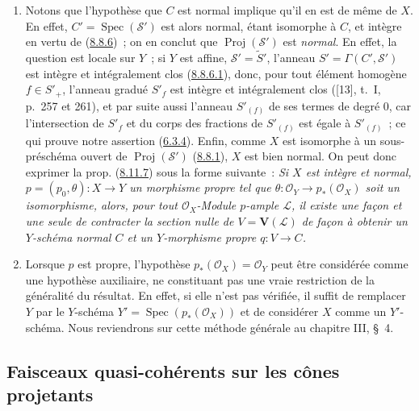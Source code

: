 \begin{remark}[8.11.8]
\label{II.8.11.8-fr}
\begin{enumerate}
  \item[\rm{(i)}] Notons que l'hypothèse que $C$ est normal implique qu'il en
  est de même de $X$. En effet, $C'=\operatorname{Spec}(\mathcal{S}')$ est
  alors normal, étant isomorphe à $C$, et intègre en vertu de
  (\hyperref[II.8.8.6-fr]{8.8.6})~; on en conclut que
  $\operatorname{Proj}(\mathcal{S}')$ est \emph{normal}. En effet, la question
  est locale sur $Y$~; si $Y$ est affine, $\mathcal{S}'=\widetilde{S}'$,
  l'anneau $S'=\Gamma(C',\mathcal{S}')$ est intègre et intégralement clos
  (\hyperref[II.8.8.6.1-fr]{8.8.6.1}), donc, pour tout élément homogène
  $f\in S'_+$, l'anneau gradué $S'_f$ est intègre et intégralement clos
  ([13], t.~I, p.~257 et 261), et par suite aussi l'anneau $S'_{(f)}$ de ses
  termes de degré 0, car l'intersection de $S'_f$ et du corps des fractions de
  $S'_{(f)}$ est égale à $S'_{(f)}$~; ce qui prouve notre assertion
  (\hyperref[II.6.3.4-fr]{6.3.4}). Enfin, comme $X$ est isomorphe à un
  sous-préschéma ouvert de $\operatorname{Proj}(\mathcal{S}')$
  (\hyperref[II.8.8.1-fr]{8.8.1}), $X$ est bien normal. On peut donc exprimer
  la prop. (\hyperref[II.8.11.7-fr]{8.11.7}) sous la forme suivante~:
  \emph{Si $X$ est intègre et normal,
  $p=(p_0,\theta):X\to Y$ un morphisme propre tel que
  $\theta:\mathcal{O}_Y\to p_*(\mathcal{O}_X)$ soit un isomorphisme, alors,
  pour tout $\mathcal{O}_X$-Module $p$-ample $\mathcal{L}$, il existe une
  façon et une seule de contracter la section nulle de
  $V=\mathbf{V}(\mathcal{L})$ de façon à obtenir un $Y$-schéma normal $C$ et
  un $Y$-morphisme propre $q:V\to C$.}
  \item[\rm{(ii)}] Lorsque $p$ est propre, l'hypothèse
  $p_*(\mathcal{O}_X)=\mathcal{O}_Y$ peut être considérée comme une hypothèse
  auxiliaire, ne constituant pas une vraie restriction de la généralité du
  résultat. En effet, si elle n'est pas vérifiée, il suffit de remplacer $Y$
  par le $Y$-schéma
  $Y'=\operatorname{Spec}(p_*(\mathcal{O}_X))$ et de considérer $X$ comme un
  $Y'$-schéma. Nous reviendrons sur cette méthode générale au chapitre III,
  \S~4.
\end{enumerate}
\end{remark}
\subsection{Faisceaux quasi-cohérents sur les cônes projetants}
\label{subsection:II.8.12-fr}

